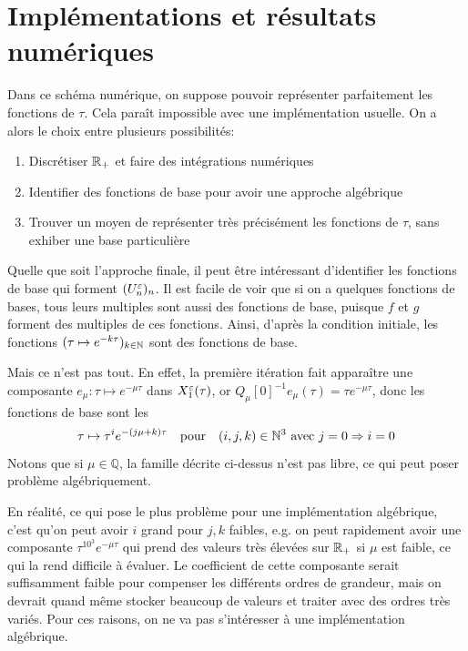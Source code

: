 \chapter{Implémentations et résultats numériques}

Dans ce schéma numérique, on suppose pouvoir représenter parfaitement les fonctions de $\tau$. Cela paraît impossible avec une implémentation usuelle. On a alors le choix entre plusieurs possibilités:
\begin{enumerate}
\item Discrétiser $\mathbb{R}_+$ et faire des intégrations numériques 
\item Identifier des fonctions de base pour avoir une approche algébrique 
\item Trouver un moyen de représenter très précisément les fonctions de $\tau$, sans exhiber une base particulière
\end{enumerate}

Quelle que soit l'approche finale, il peut être intéressant d'identifier les fonctions de base qui forment $(U_n^{\varepsilon})_n$. 
Il est facile de voir que si on a quelques fonctions de bases, tous leurs multiples sont aussi des fonctions de base, puisque $f$ et $g$ forment des multiples de ces fonctions. 
Ainsi, d'après la condition initiale, les fonctions $(\tau\mapsto e^{-k\tau})_{k\in\mathbb{N}}$ sont des fonctions de base. 

Mais ce n'est pas tout. En effet, la première itération fait apparaître une composante $e_{\mu}:\tau \mapsto e^{-\mu\tau}$ dans $X_1^{\varepsilon}(\tau)$, or $Q_{\mu}[0]^{-1}e_{\mu}(\tau) = \tau e^{-\mu\tau}$, donc les fonctions de base sont les 
$$ \tau\mapsto \tau^i e^{-(j\mu+k)\tau} \quad\text{pour}\quad 
(i,j,k)\in\mathbb{N}^3 \text{ avec } j = 0 \Rightarrow i=0 $$
Notons que si $\mu\in\mathbb{Q}$, la famille décrite ci-dessus n'est pas libre, ce qui peut poser problème algébriquement. 

En réalité, ce qui pose le plus problème pour une implémentation algébrique, c'est qu'on peut avoir $i$ grand pour $j,k$ faibles, e.g. on peut rapidement avoir une composante $\tau^{10^3} e^{-\mu\tau}$ qui prend des valeurs très élevées sur $\mathbb{R}_+$ si $\mu$ est faible, ce qui la rend difficile à évaluer. 
Le coefficient de cette composante serait suffisamment faible pour compenser les différents ordres de grandeur, mais on devrait quand même stocker beaucoup de valeurs et traiter avec des ordres très variés. 
Pour ces raisons, on ne va pas s'intéresser à une implémentation algébrique. 
\\ 

